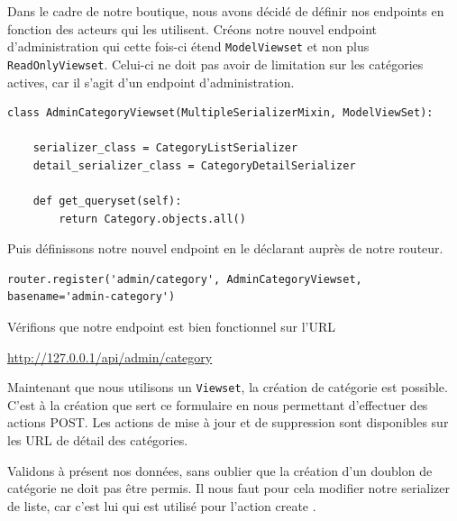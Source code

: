 \documentclass[a4paper]{article}
\begin{document}
Dans le cadre de notre boutique, nous avons décidé de {\color{monOrange}définir nos endpoints} en fonction des {\color{monOrange}acteurs} qui les utilisent. Créons {\color{monOrange}notre nouvel endpoint d’administration} qui cette fois-ci étend {\tt ModelViewset}  et non plus {\tt ReadOnlyViewset}. Celui-ci ne doit pas avoir de limitation sur les catégories actives, car il s’agit d’un endpoint d’administration.
\begin{verbatim}
class AdminCategoryViewset(MultipleSerializerMixin, ModelViewSet):
 
    serializer_class = CategoryListSerializer
    detail_serializer_class = CategoryDetailSerializer
 
    def get_queryset(self):
        return Category.objects.all()
\end{verbatim}
Puis définissons notre nouvel endpoint en le {\color{monOrange}déclarant auprès de notre routeur}.

\begin{verbatim}
router.register('admin/category', AdminCategoryViewset, basename='admin-category')
\end{verbatim}
Vérifions que notre endpoint est bien fonctionnel sur l’URL  
\begin{center}
\url{http://127.0.0.1/api/admin/category}
\end{center}
Maintenant que nous utilisons un {\tt Viewset}, {\color{monOrange}la création de catégorie est possible}. C’est à la création que sert ce formulaire en nous permettant d'effectuer des actions POST. Les actions de mise à jour et de suppression sont disponibles sur les URL de détail des catégories.

Validons à présent nos données, sans oublier que la création d’un doublon de catégorie ne doit pas être permis. Il nous faut pour cela modifier notre serializer de liste, car c’est lui qui est utilisé pour l’action create  .
\end{document}
